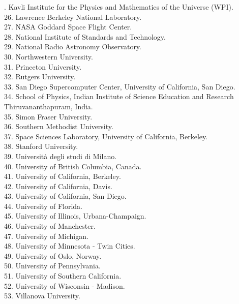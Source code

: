 \documentclass[PICOReport.tex]{subfiles}
\begin{document}
\begin{multicols}{2}
{. Kavli Institute for the Physics and Mathematics of the Universe (WPI).  \\
26. Lawrence Berkeley National Laboratory.  \\
27. NASA Goddard Space Flight Center.  \\
28. National Institute of Standards and Technology.  \\
29. National Radio Astronomy Observatory.  \\
30. Northwestern University.  \\
31. Princeton University.  \\
32. Rutgers University.  \\
33. San Diego Supercomputer Center, University of California, San Diego.  \\
34. School of Physics, Indian Institute of Science Education and Research Thiruvananthapuram,  India.  \\
35. Simon Fraser University.  \\
36. Southern Methodist University.  \\
37. Space Sciences Laboratory, University of California, Berkeley.  \\
38. Stanford University.  \\
39. Universit\`a degli studi di Milano.  \\
40. University of British Columbia, Canada.  \\
41. University of California, Berkeley.  \\
42. University of California, Davis.  \\
43. University of California, San Diego.  \\
44. University of Florida.  \\
45. University of Illinois, Urbana-Champaign.  \\
46. University of Manchester.  \\
47. University of Michigan.  \\
48. University of Minnesota - Twin Cities.  \\
49. University of Oslo, Norway.  \\
50. University of Pennsylvania.  \\
51. University of Southern California.  \\
52. University of Wisconsin - Madison.  \\
53. Villanova University.  \\
}
\end{multicols}
\end{document}
